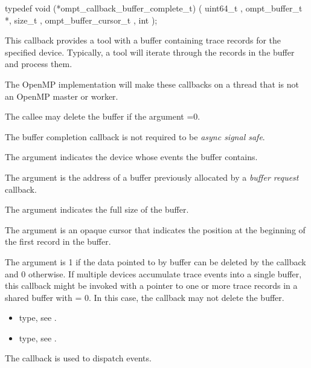 \format

\begin{ccppspecific}
\begin{omptCallback}
typedef void (*ompt_callback_buffer_complete_t) (
  uint64_t ,
  ompt_buffer_t *,
  size_t ,
  ompt_buffer_cursor_t ,
  int 
);
\end{omptCallback}
\end{ccppspecific}


\descr
This callback provides a tool with a buffer containing trace records for the
specified device. Typically, a tool will iterate through the records
in the buffer and process them.

The OpenMP implementation will make these callbacks
on a thread that is not an OpenMP master or worker.

The callee may delete the buffer if the argument
=0.

The buffer completion callback is not
required to be \emph{async signal safe}.

\argdesc

The argument  indicates the device whose events
the buffer contains.

The argument  is the address of a buffer previously
allocated by a \emph{buffer request} callback.

The argument  indicates the full size of the buffer.

The argument  is an opaque cursor that indicates the
position at the beginning of the first record in the buffer.

The argument  is 1 if the data pointed to by
buffer can be deleted by the callback and 0 otherwise. If multiple
devices accumulate trace events into a single buffer, this callback
might be invoked with a pointer to one or more trace records in a
shared buffer with  = 0. In this case, the callback
may not delete the buffer.

\crossreferences
\begin{itemize}
\item {} type, see
.
\item {} type, see
.
\end{itemize}

\label{sec:ompt_callback_control_tool_t}
\summary
The  callback is used to dispatch
 events.

